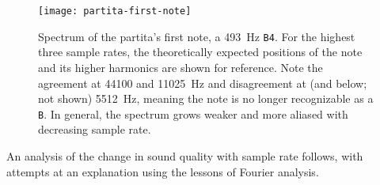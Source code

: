 \documentclass[11pt, a4paper]{article}
\begin{document}
\begin{figure}[htb!]
\centering
\texttt{[image: partita-first-note]}
\vspace{-8mm}
\caption{Spectrum of the partita's first note, a \SI{493}{\hertz} \texttt{B4}. For the highest three sample rates, the theoretically expected positions of the note and its higher harmonics are shown for reference. Note the agreement at 44100 and \SI{11025}{\hertz} and disagreement at (and below; not shown) \SI{5512}{\hertz}, meaning the note is no longer recognizable as a \texttt{B}. In general, the spectrum grows weaker and more aliased with decreasing sample rate.}
\label{dft:fig:first-note}
\end{figure}



An analysis of the change in sound quality with sample rate follows, with attempts at an explanation using the lessons of Fourier analysis. 
\end{document}
